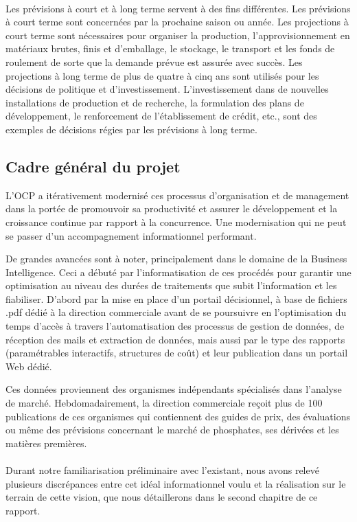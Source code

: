 	\paragraph{}
	Les prévisions à court et à long terme servent à des fins différentes. Les prévisions à court terme sont concernées par la prochaine saison ou année. Les projections à court terme sont nécessaires pour organiser la production, l'approvisionnement en matériaux brutes, finis et d'emballage, le stockage, le transport et les fonds de roulement de sorte que la demande prévue est assurée avec succès. Les projections à long terme de plus de quatre à cinq ans sont utilisés pour les décisions de politique et d'investissement. L'investissement dans de nouvelles installations de production et de recherche, la formulation des plans de développement, le renforcement de l'établissement de crédit, etc., sont des exemples de décisions régies par les prévisions à long terme.
	\subsection{Cadre général du projet}\label{CGP}
	L'OCP a itérativement modernisé ces processus d'organisation et de management dans la portée de promouvoir sa productivité et assurer le développement et la croissance continue
	par rapport à la concurrence. Une modernisation qui ne peut se passer d'un accompagnement informationnel performant.\par
	De grandes avancées sont à noter, principalement dans le domaine de la Business Intelligence. Ceci a débuté par l’informatisation de ces procédés pour garantir une optimisation au niveau des durées de traitements que subit l’information et les fiabiliser. D'abord par la mise en place d’un portail décisionnel, à base de fichiers .pdf dédié à la direction commerciale avant de se poursuivre en l’optimisation du temps d’accès à travers l’automatisation des processus de gestion de données, de
	réception des mails et extraction de données, mais aussi par le type des rapports (paramétrables
	interactifs, structures de coût) et leur publication dans un portail Web dédié.
	\par
	Ces données proviennent des organismes indépendants spécialisés dans l'analyse de marché. Hebdomadairement, la direction commerciale reçoit plus de 100 publications de ces organismes qui contiennent des guides de prix, des évaluations ou même des prévisions concernant le marché de phosphates, ses dérivées et les matières premières.
	\paragraph{}
	Durant notre familiarisation préliminaire avec l'existant, nous avons relevé plusieurs discrépances entre cet idéal informationnel voulu et la réalisation sur le terrain de cette vision, que nous détaillerons dans le second chapitre de ce rapport.
